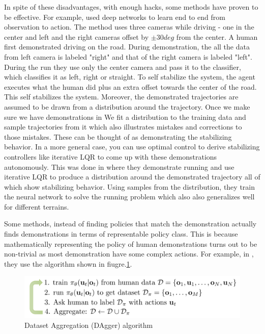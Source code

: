 \documentclass[11pt]{article}
\begin{document}
In spite of these disadvantages, with enough hacks, some methods have proven to be effective. For example, \cite{nvidia} used deep networks to learn end to end from observation to action. The method uses three cameras while driving - one in the center and left and the right cameras offset by $\pm30 deg$ from the center. A human first demonstrated driving on the road. During demonstration, the all the data from left camera is labeled "right" and that of the right camera is labeled "left". During the run they use only the center camera and pass it to the classifier, which classifies it as left, right or straight. To self stabilize the system, the agent executes what the human did plus an extra offset towards the center of the road. This self stabilizes the system. Moreover, the demonstrated trajectories are assumed to be drawn from a distribution around the trajectory. Once we make sure we have demonstrations in  We fit a distribution to the training data and sample trajectories from it which also illustrates mistakes and corrections to those mistakes. These can be thought of as demonstrating the stabilizing behavior. In a more general case, you can use optimal control to derive stabilizing controllers like iterative LQR to come up with these demonstrations autonomously. This was done in \cite{walking} where they demonstrate running and use iterative LQR to produce a distribution around the demonstrated trajectory all of which show stabilizing behavior. Using samples from the distribution, they train the neural network to solve the running problem which also also generalizes well for different terrains. 

Some methods, instead of finding policies that match the demonstration actually finds demonstrations in terms of representable policy class. This is because mathematically representing the policy of human demonstrations turns out to be non-trivial as most demonstration have some complex actions.  For example, in \cite{dagger}, they use the algorithm shown in fiugre.\ref{fig:dagger}. 

\begin{figure}[H]
  \begin{center}
    \includegraphics[width=0.7\linewidth]{images/dagger.png}
    \caption{Dataset Aggregation (DAgger) algorithm}
    \label{fig:dagger}
  \end{center}
\end{figure}
\end{document}
